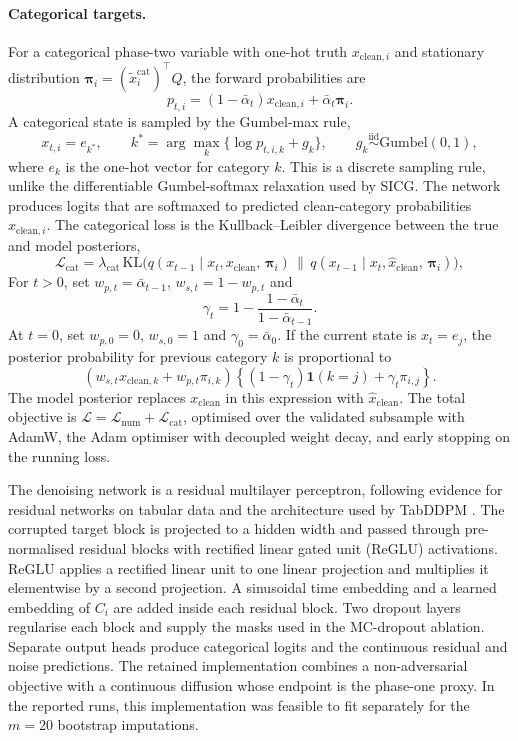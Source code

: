 \paragraph{Categorical targets.} For a categorical phase-two variable with one-hot truth $x_{\mathrm{clean},i}$ and stationary distribution $\boldsymbol{\pi}_i = (\tilde{x}_i^{\text{cat}})^{\top} Q$, the forward probabilities are
\[
p_{t,i}=(1-\bar\alpha_t)x_{\mathrm{clean},i}+\bar\alpha_t\boldsymbol\pi_i.
\]
A categorical state is sampled by the Gumbel-max rule,
\[
x_{t,i}=e_{k^*},\qquad k^*=\arg\max_k\{\log p_{t,i,k}+g_k\},\qquad g_k\stackrel{\mathrm{iid}}{\sim}\mathrm{Gumbel}(0,1),
\]
where $e_k$ is the one-hot vector for category $k$. This is a discrete sampling rule, unlike the differentiable Gumbel-softmax relaxation used by SICG. The network produces logits that are softmaxed to predicted clean-category probabilities $\hat{x}_{\mathrm{clean},i}$. The categorical loss is the Kullback--Leibler divergence between the true and model posteriors,
\begin{equation}
\mathcal{L}_{\text{cat}} = \lambda_{\text{cat}}\, \mathrm{KL}\bigl( q(x_{t-1} \mid x_t, x_{\mathrm{clean}},\, \boldsymbol{\pi}_i) \,\big\|\, q(x_{t-1} \mid x_t, \hat{x}_{\mathrm{clean}},\, \boldsymbol{\pi}_i) \bigr),
\label{eq:sird_cat_loss}
\end{equation}
For $t>0$, set $w_{p,t}=\bar\alpha_{t-1}$, $w_{s,t}=1-w_{p,t}$ and
\[
\gamma_t=1-\frac{1-\bar\alpha_t}{1-\bar\alpha_{t-1}}.
\]
At $t=0$, set $w_{p,0}=0$, $w_{s,0}=1$ and $\gamma_0=\bar\alpha_0$. If the current state is $x_t=e_j$, the posterior probability for previous category $k$ is proportional to
\begin{equation}
\left(w_{s,t}x_{\mathrm{clean},k}+w_{p,t}\pi_{i,k}\right)
\left\{(1-\gamma_t)\mathbf{1}(k=j)+\gamma_t\pi_{i,j}\right\}.
\label{eq:sird_cat_posterior}
\end{equation}
The model posterior replaces $x_{\mathrm{clean}}$ in this expression with $\hat x_{\mathrm{clean}}$. The total objective is $\mathcal{L} = \mathcal{L}_{\text{num}} + \mathcal{L}_{\text{cat}}$, optimised over the validated subsample with AdamW, the Adam optimiser with decoupled weight decay, and early stopping on the running loss.

The denoising network is a residual multilayer perceptron, following evidence for residual networks on tabular data \citep{gorishniy2021revisiting} and the architecture used by TabDDPM \citep{kotelnikov2023tabddpm}. The corrupted target block is projected to a hidden width and passed through pre-normalised residual blocks with rectified linear gated unit (ReGLU) activations. ReGLU applies a rectified linear unit to one linear projection and multiplies it elementwise by a second projection. A sinusoidal time embedding and a learned embedding of $C_i$ are added inside each residual block. Two dropout layers regularise each block and supply the masks used in the MC-dropout ablation. Separate output heads produce categorical logits and the continuous residual and noise predictions. The retained implementation combines a non-adversarial objective with a continuous diffusion whose endpoint is the phase-one proxy. In the reported runs, this implementation was feasible to fit separately for the $m=20$ bootstrap imputations.

